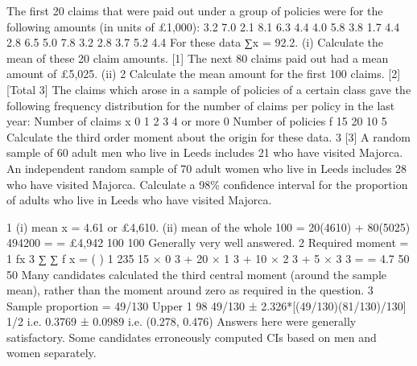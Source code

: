 \documentclass[a4paper,12pt]{article}
\begin{document}
\begin{enumerate}
The first 20 claims that were paid out under a group of policies were for the following
amounts (in units of £1,000):
3.2
7.0
2.1
8.1
6.3
4.4
4.0
5.8
3.8
1.7
4.4
2.8
6.5
5.0
7.8
3.2
2.8
3.7
5.2
4.4
For these data ∑x = 92.2.
(i)
Calculate the mean of these 20 claim amounts.
[1]
The next 80 claims paid out had a mean amount of £5,025.
(ii)
2
Calculate the mean amount for the first 100 claims.
[2]
[Total 3]
The claims which arose in a sample of policies of a certain class gave the following
frequency distribution for the number of claims per policy in the last year:
Number of claims x 0 1 2 3 4 or more
0
Number of policies f 15 20 10 5
Calculate the third order moment about the origin for these data.
3
[3]
A random sample of 60 adult men who live in Leeds includes 21 who have visited Majorca. An independent random sample of 70 adult women who live in Leeds includes 28 who have visited Majorca.
Calculate a 98\% confidence interval for the proportion of adults who live in Leeds
who have visited Majorca.
\end{enumerate}
\newpage
1
(i) mean x = 4.61 or £4,610.
(ii) mean of the whole 100 =
20(4610) + 80(5025) 494200
=
= £4,942
100
100
Generally very well answered.
2
Required moment =
1
fx 3
∑
∑ f
x
=
(
)
1
235
15 × 0 3 + 20 × 1 3 + 10 × 2 3 + 5 × 3 3 =
= 4.7
50
50
Many candidates calculated the third central moment (around the sample mean), rather than
the moment around zero as required in the question.
3
Sample proportion = 49/130
Upper 1%
98%
49/130 ± 2.326*[(49/130)(81/130)/130] 1/2 i.e. 0.3769 ± 0.0989 i.e. (0.278, 0.476)
Answers here were generally satisfactory. Some candidates erroneously computed CIs based
on men and women separately.
\end{document}
